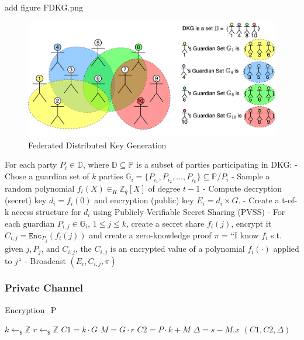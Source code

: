 \documentclass{article}
\begin{document}
add figure FDKG.png

\begin{figure}
    \centering
    \includegraphics[width=\textwidth]{FDKG.png}
    \caption{Federated Distributed Key Generation}
    \label{fig:FDKG}
\end{figure}

For each party $P_i \in \mathbb{D}$, where $\mathbb{D} \subseteq  \mathbb{P}$ is a subset of parties participating in DKG:
- Chose a guardian set of $k$ parties  $\mathbb{G}_i=\{P_{i_1},P_{i_2},\dots,P_{i_k}\}\subseteq \mathbb{P}/P_i$
- Sample a random polynomial $f_{i}(X) \in_R \mathbb{Z}_q[X]$ of degree $t-1$
- Compute decryption (secret) key $d_{i}= f_i(0)$ and encryption (public) key $E_{i} = d_i \times G$.
- Create a t-of-k access structure for $d_i$ using Publicly Verifiable Secret Sharing (PVSS)
- For each guardian $P_{i,j} \in \mathbb{G}_i$, $1 \leq j \leq k$, create a secret share $f_i(j)$, encrypt it $C_{i,j}=\texttt{Enc}_{P_j}(f_i(j))$ and create a zero-knowledge proof $\pi$ = “I know $f_i$ s.t. given $j, P_j$, and $C_{i,j}$, the $C_{i,j}$ is an encrypted value of a polynomial $f_i(\cdot)$ applied to $j$“
- Broadcast $(E_i,C_{i,j}, \pi)$


\subsubsection{Private Channel}

\begin{algorithm}
    \caption{Encryption\_P}
    
    
    $k \gets_\$ \mathbb{Z}$\;
    $r \gets_\$ \mathbb{Z}$\;
    $C1 = k \cdot G$\;
    $M = G \cdot r$\;
    $C2 = P \cdot k + M$\;
    $\Delta = s - M.x$\;
    \Return $(C1, C2, \Delta)$\;
\end{algorithm}
\end{document}
